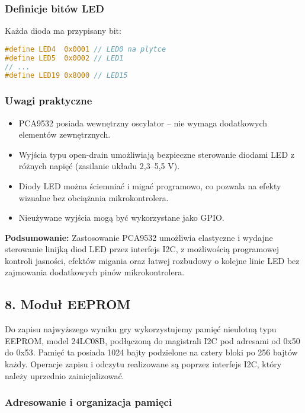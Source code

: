 \documentclass[a4paper,12pt]{report}
\begin{document}
\subsubsection*{Definicje bitów LED}

Każda dioda ma przypisany bit:
\begin{lstlisting}[language=C]
#define LED4  0x0001 // LED0 na plytce
#define LED5  0x0002 // LED1
// ...
#define LED19 0x8000 // LED15
\end{lstlisting}

\subsubsection*{Uwagi praktyczne}

\begin{itemize}
    \item PCA9532 posiada wewnętrzny oscylator – nie wymaga dodatkowych elementów zewnętrznych.
    \item Wyjścia typu open-drain umożliwiają bezpieczne sterowanie diodami LED z różnych napięć (zasilanie układu 2,3–5,5 V).
    \item Diody LED można ściemniać i migać programowo, co pozwala na efekty wizualne bez obciążania mikrokontrolera.
    \item Nieużywane wyjścia mogą być wykorzystane jako GPIO.
\end{itemize}

\textbf{Podsumowanie:}  
Zastosowanie PCA9532 umożliwia elastyczne i wydajne sterowanie linijką diod LED przez interfejs I2C, z możliwością programowej kontroli jasności, efektów migania oraz łatwej rozbudowy o kolejne linie LED bez zajmowania dodatkowych pinów mikrokontrolera.

\subsection*{8. Moduł EEPROM}

Do zapisu najwyższego wyniku gry wykorzystujemy pamięć nieulotną typu EEPROM, model 24LC08B, podłączoną do magistrali I2C pod adresami od 0x50 do 0x53. Pamięć ta posiada 1024 bajty podzielone na cztery bloki po 256 bajtów każdy. Operacje zapisu i odczytu realizowane są poprzez interfejs I2C, który należy uprzednio zainicjalizować.

\subsubsection*{Adresowanie i organizacja pamięci}
\end{document}

